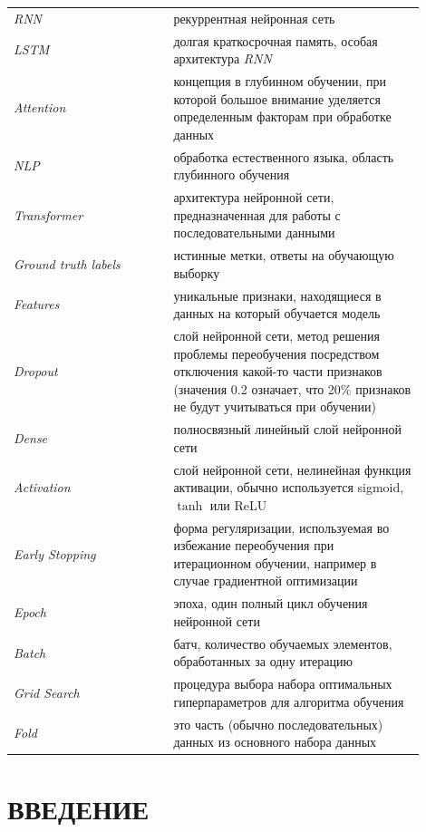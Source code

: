 \documentclass[14pt]{extarticle}
\begin{document}
\label{glossary}
\begin{longtable}{p{0.35\linewidth}p{0.55\linewidth}}
	\hline
	\hline
	{\it RNN}  & рекуррентная нейронная сеть \\[-2mm]
	{\it LSTM} & долгая краткосрочная память, особая архитектура {\it RNN} \\[-2mm]
	{\it Attention} & концепция в глубинном обучении, при которой большое внимание уделяется определенным факторам при обработке данных \\[-2mm]
	{\it NLP}  & обработка естественного языка, область глубинного обучения\\[-2mm]
	{\it Transformer}  & архитектура нейронной сети, предназначенная для работы с последовательными данными\\[-2mm]
	{\it Ground truth labels}  & истинные метки, ответы на обучающую выборку\\[-2mm]
	{\it Features}  & уникальные признаки, находящиеся в данных на который обучается модель\\[-2mm]
	{\it Dropout}  & слой нейронной сети, метод решения проблемы переобучения посредством отключения какой-то части признаков (значения 0.2 означает, что 20\% признаков не будут учитываться при обучении)\\[-2mm]
	{\it Dense}  & полносвязный линейный слой нейронной сети\\[-2mm]
	{\it Activation}  & слой нейронной сети, нелинейная функция активации, обычно используется sigmoid, $\tanh$ или ReLU\\[-2mm]
	{\it Early Stopping}  & форма регуляризации, используемая во избежание переобучения при итерационном обучении, например в случае градиентной оптимизации\\[-2mm]
	{\it Epoch}  & эпоха, один полный цикл обучения нейронной сети\\[-2mm]
	{\it Batch}  & батч, количество обучаемых элементов, обработанных за одну итерацию\\[-2mm]
	{\it Grid Search}  & процедура выбора набора оптимальных гиперпараметров для алгоритма обучения\\[-2mm]
	{\it Fold}  & это часть (обычно последовательных) данных из основного набора данных\\
	\hline
	\hline
\end{longtable}

\newpage

\section{ВВЕДЕНИЕ}
\label{sec:intro}
\end{document}
